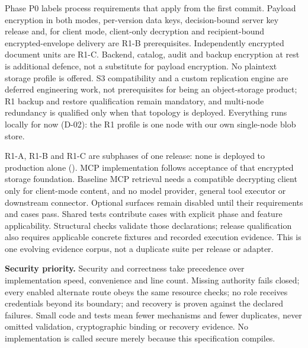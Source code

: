 Phase P0 labels process requirements that apply from the first commit. Payload encryption in both modes, per-version data keys, decision-bound server key release and, for client mode, client-only decryption and recipient-bound encrypted-envelope delivery are R1-B prerequisites. Independently encrypted document units are R1-C. Backend, catalog, audit and backup encryption at rest is additional defence, not a substitute for payload encryption. No plaintext storage profile is offered. S3 compatibility and a custom replication engine are deferred engineering work, not prerequisites for being an object-storage product; R1 backup and restore qualification remain mandatory, and multi-node redundancy is qualified only when that topology is deployed. Everything runs locally for now (D-02): the R1 profile is one node with our own single-node blob store.

R1-A, R1-B and R1-C are subphases of one release: none is deployed to production alone (). MCP implementation follows acceptance of that encrypted storage foundation. Baseline MCP retrieval needs a compatible decrypting client only for client-mode content, and no model provider, general tool executor or downstream connector. Optional surfaces remain disabled until their requirements and cases pass. Shared tests contribute cases with explicit phase and feature applicability. Structural checks validate those declarations; release qualification also requires applicable concrete fixtures and recorded execution evidence. This is one evolving evidence corpus, not a duplicate suite per release or adapter.

\textbf{Security priority.} Security and correctness take precedence over implementation speed, convenience and line count. Missing authority fails closed; every enabled alternate route obeys the same resource checks; no role receives credentials beyond its boundary; and recovery is proven against the declared failures. Small code and tests mean fewer mechanisms and fewer duplicates, never omitted validation, cryptographic binding or recovery evidence. No implementation is called secure merely because this specification compiles.

